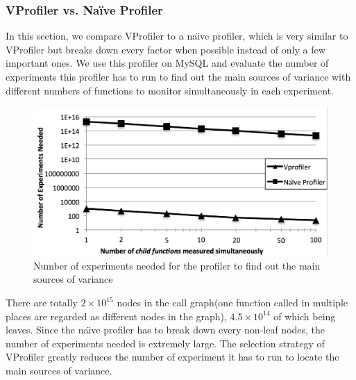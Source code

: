 \subsubsection{VProfiler vs. Naïve Profiler}
In this section, we compare VProfiler to a na\"{\i}ve profiler, which is very
similar to VProfiler but breaks down every factor when possible instead of only
a few important ones. We use this profiler on MySQL and evaluate the number of
experiments this profiler has to run to find out the main sources of variance
with different numbers of functions to monitor simultaneously in each 
experiment.

\begin{figure}
    \centering
    \includegraphics[scale=0.3]{plots/experiments}
\caption{Number of experiments needed for the profiler to find out the main sources of variance}
\label{fig:experiments}
\end{figure}

There are totally $2 \times 10^{15}$ nodes in the call graph(one function 
called in multiple places are regarded as different nodes in the graph),
$4.5 \times 10^{14}$ of which being leaves. Since the na\"{\i}ve profiler has
to break down every non-leaf nodes, the number of experiments needed is
extremely large. The selection strategy of VProfiler greatly reduces the number
of experiment it has to run to locate the main sources of variance.
